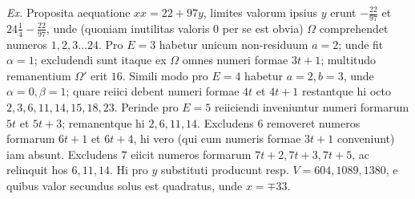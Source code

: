 \textit{Ex.} Proposita aequatione \(xx=22+97y\), limites valorum ipsius \(y\) erunt \(-\frac{22}{97}\) et \(24\frac14-\frac{22}{97}\), unde (quoniam inutilitas valoris \(0\) per se est obvia) \(\Omega\) comprehendet numeros \(1,\allowbreak 2,\allowbreak 3\ldots24\). Pro \(E=3\) habetur unicum non-residuum \(a=2\); unde fit \(\alpha=1\); excludendi sunt itaque ex \(\Omega\) omnes numeri formae \(3t+1\); multitudo remanentium \(\Omega'\) erit \(16\). Simili modo pro \(E=4\) habetur \(a=2,\allowbreak b=3\), unde \(\alpha=0,\allowbreak \beta=1\); quare reiici debent numeri formae \(4t\) et \(4t+1\) restantque hi octo \(2,\allowbreak 3,\allowbreak 6,\allowbreak 11,\allowbreak 14,\allowbreak 15,\allowbreak 18,\allowbreak 23\). Perinde pro \(E=5\) reiiciendi inveniuntur numeri formarum \(5t\) et \(5t+3\); remanentque hi \(2,\allowbreak 6,\allowbreak 11,\allowbreak 14\). Excludens \(6\) removeret numeros formarum \(6t+1\) et \(6t+4\), hi vero (qui cum numeris formae \(3t+1\) conveniunt) iam absunt. Excludens \(7\) eiicit numeros formarum \(7t+2,\allowbreak 7t+3,\allowbreak 7t+5\), ac relinquit hos \(6,\allowbreak 11,\allowbreak 14\). Hi pro \(y\) substituti producunt resp. \(V=604,\allowbreak 1089,\allowbreak 1380\), e quibus valor secundus solus est quadratus, unde \(x=\mp33\).

